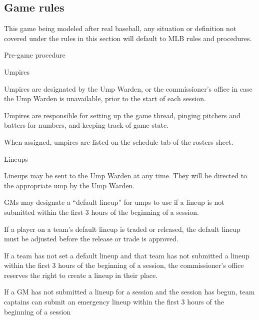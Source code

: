 
\subsection{Game rules}
\label{sec:game rules}
\begin{deepEnumerate}
	\item This game being modeled after real baseball, 
	any situation or definition not covered under the rules in this section 
	will default to MLB rules and procedures.
	\item Pre-game procedure
	\begin{deepEnumerate}
		\item Umpires 
		\begin{deepEnumerate}
			\item Umpires are designated by the Ump Warden, 
			or the commissioner's office in case the Ump Warden is unavailable,
			prior to the start of each session.
			\item Umpires are responsible for setting up the game thread, 
			pinging pitchers and batters for numbers, and
			keeping track of game state.
			\item When assigned, umpires are listed on the schedule tab of the rosters sheet.
		\end{deepEnumerate}
		\item Lineups
		\begin{deepEnumerate}
			\item Lineups may be sent to the Ump Warden at any time. 
			They will be directed to the appropriate ump by the Ump Warden.
			\item GMs may designate a “default lineup” for umps to use 
			if a lineup is not submitted within the first 3 hours of the beginning of a session.
			\begin{deepEnumerate}
				\item If a player on a team’s default lineup is traded or released, 
				the default lineup must be adjusted before the release or trade is approved.
				\item If a team has not set a default lineup and that team has not submitted
				a lineup within the first 3 hours of the beginning of a session, the commissioner's 
				office reserves the right to create a lineup in their place.
				\item If a GM has not submitted a lineup for a session and the session has begun, 
				\label{sec:captain lineups}
				team captains can submit an emergency lineup within the first 3 hours of the beginning of a session 

\end{deepEnumerate}
\end{deepEnumerate}
\end{deepEnumerate}
\end{deepEnumerate}
